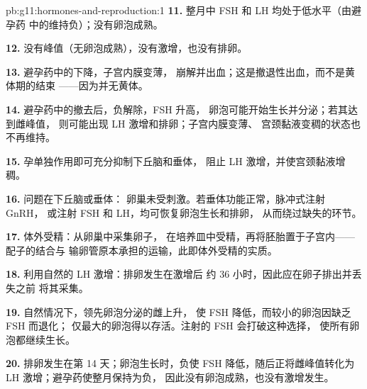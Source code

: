 \begin{solution}{pb:g11:hormones-and-reproduction:1}
\textbf{11.} 整月中 FSH 和 LH 均处于低水平（由避孕药
中的维持负）；没有卵泡成熟。

\textbf{12.} 没有峰值（无卵泡成熟），没有激增，也没有排卵。

\textbf{13.} 避孕药中的下降，子宫内膜变薄，
崩解并出血；这是撤退性出血，而不是黄体期的结束
——因为并无黄体。

\textbf{14.} 避孕药中的撤去后，负解除，FSH 升高，
卵泡可能开始生长并分泌；若其达到雌峰值，
则可能出现 LH 激增和排卵；子宫内膜变薄、
宫颈黏液变稠的状态也不再维持。

\textbf{15.} 孕单独作用即可充分抑制下丘脑和垂体，
阻止 LH 激增，并使宫颈黏液增稠。

\textbf{16.} 问题在下丘脑或垂体：
卵巢未受刺激。若垂体功能正常，脉冲式注射 GnRH，
或注射 FSH 和 LH，均可恢复卵泡生长和排卵，
从而绕过缺失的环节。

\textbf{17.} 体外受精：从卵巢中采集卵子，
在培养皿中受精，再将胚胎置于子宫内——配子的结合与
输卵管原本承担的运输，此即体外受精的实质。

\textbf{18.} 利用自然的 LH 激增：排卵发生在激增后
约 36 小时，因此应在卵子排出并丢失之前
将其采集。

\textbf{19.} 自然情况下，领先卵泡分泌的雌上升，
使 FSH 降低，而较小的卵泡因缺乏 FSH 而退化；
仅最大的卵泡得以存活。注射的 FSH 会打破这种选择，
使所有卵泡都继续生长。

\textbf{20.} 排卵发生在第 14 天；卵泡生长时，负使
FSH 降低，随后正将雌峰值转化为
LH 激增；避孕药使整月保持为负，
因此没有卵泡成熟，也没有激增发生。
\end{solution}
